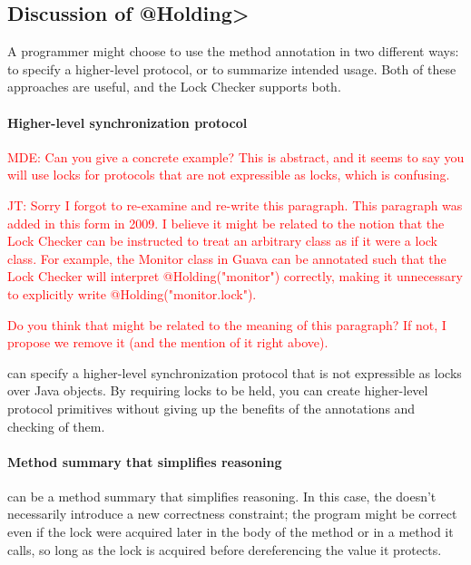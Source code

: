 \subsection{Discussion of \<@Holding>\label{lock-checker-holding}}

A programmer might choose to use the  method annotation in
two different ways:  to specify a higher-level protocol, or to summarize
intended usage.  Both of these approaches are useful, and the Lock Checker
supports both.

\paragraph{Higher-level synchronization protocol\label{lock-checker-holding-highlevel}}

\textcolor{red}{MDE: Can you give a concrete example? This is abstract, and it seems
to say you will use locks for protocols that are not expressible as locks, which is confusing.}

\textcolor{red}{JT: Sorry I forgot to re-examine and re-write this paragraph. This paragraph
was added in this form in 2009. I believe it might be related to the notion that the Lock
Checker can be instructed to treat an arbitrary class as if it were a lock class. For example,
the Monitor class in Guava can be annotated such that the Lock Checker will interpret
@Holding("monitor") correctly, making it unnecessary to explicitly write @Holding("monitor.lock").}

\textcolor{red}{Do you think that might be related to the meaning of this paragraph? If not, I propose we remove
it (and the mention of it right above).}

   can specify a higher-level synchronization protocol that
  is not expressible as locks over Java objects.  By requiring locks to be
  held, you can create higher-level protocol primitives without giving up
  the benefits of the annotations and checking of them.

\paragraph{Method summary that simplifies reasoning\label{lock-checker-holding-method-summary}}

   can be a method summary that simplifies reasoning.  In
  this case, the  doesn't necessarily introduce a new
  correctness constraint; the program might be correct even if the lock
  were acquired later in the body of the method or in a method it calls, so
  long as the lock is acquired before dereferencing the value it protects.

